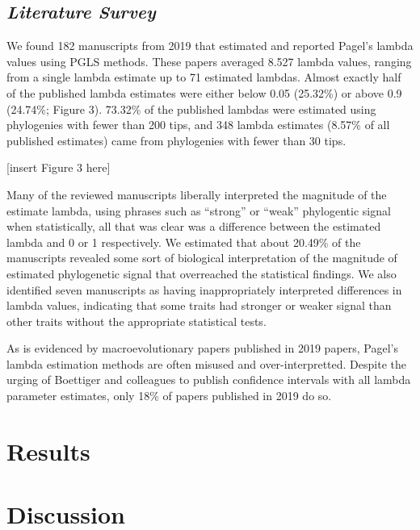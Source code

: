 \documentclass[
]{article}
\begin{document}
\hypertarget{literature-survey-1}{%
\subsection{\texorpdfstring{\emph{Literature
Survey}}{Literature Survey}}\label{literature-survey-1}}

We found 182 manuscripts from 2019 that estimated and reported Pagel's
lambda values using PGLS methods. These papers averaged 8.527 lambda
values, ranging from a single lambda estimate up to 71 estimated
lambdas. Almost exactly half of the published lambda estimates were
either below 0.05 (25.32\%) or above 0.9 (24.74\%; Figure 3). 73.32\% of
the published lambdas were estimated using phylogenies with fewer than
200 tips, and 348 lambda estimates (8.57\% of all published estimates)
came from phylogenies with fewer than 30 tips. \hfill\break

{[}insert Figure 3 here{]} \hfill\break

Many of the reviewed manuscripts liberally interpreted the magnitude of
the estimate lambda, using phrases such as ``strong'' or ``weak''
phylogentic signal when statistically, all that was clear was a
difference between the estimated lambda and 0 or 1 respectively. We
estimated that about 20.49\% of the manuscripts revealed some sort of
biological interpretation of the magnitude of estimated phylogenetic
signal that overreached the statistical findings. We also identified
seven manuscripts as having inappropriately interpreted differences in
lambda values, indicating that some traits had stronger or weaker signal
than other traits without the appropriate statistical tests.
\hfill\break

As is evidenced by macroevolutionary papers published in 2019 papers,
Pagel's lambda estimation methods are often misused and
over-interpretted. Despite the urging of Boettiger and colleagues to
publish confidence intervals with all lambda parameter estimates, only
18\% of papers published in 2019 do so.

\hypertarget{results-1}{%
\section{Results}\label{results-1}}

\hypertarget{discussion}{%
\section{Discussion}\label{discussion}}
\end{document}
